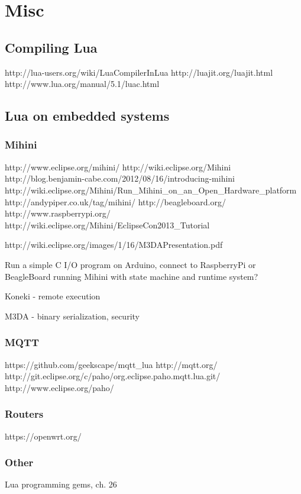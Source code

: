 \chapter{Misc}

\section{Compiling Lua}
\label{sec:compiling}

http://lua-users.org/wiki/LuaCompilerInLua
http://luajit.org/luajit.html
http://www.lua.org/manual/5.1/luac.html


\section{Lua on embedded systems}

\subsection{Mihini}

http://www.eclipse.org/mihini/
http://wiki.eclipse.org/Mihini
http://blog.benjamin-cabe.com/2012/08/16/introducing-mihini
http://wiki.eclipse.org/Mihini/Run\_Mihini\_on\_an\_Open\_Hardware\_platform
http://andypiper.co.uk/tag/mihini/
http://beagleboard.org/
http://www.raspberrypi.org/
http://wiki.eclipse.org/Mihini/EclipseCon2013\_Tutorial

http://wiki.eclipse.org/images/1/16/M3DAPresentation.pdf

Run a simple C I/O program on Arduino, connect to RaspberryPi or BeagleBoard running Mihini with state machine and runtime system?

Koneki - remote execution

M3DA - binary serialization, security

\subsection{MQTT}
https://github.com/geekscape/mqtt\_lua
http://mqtt.org/
http://git.eclipse.org/c/paho/org.eclipse.paho.mqtt.lua.git/
http://www.eclipse.org/paho/


\subsection{Routers}
https://openwrt.org/

\subsection{Other}
Lua programming gems, ch. 26